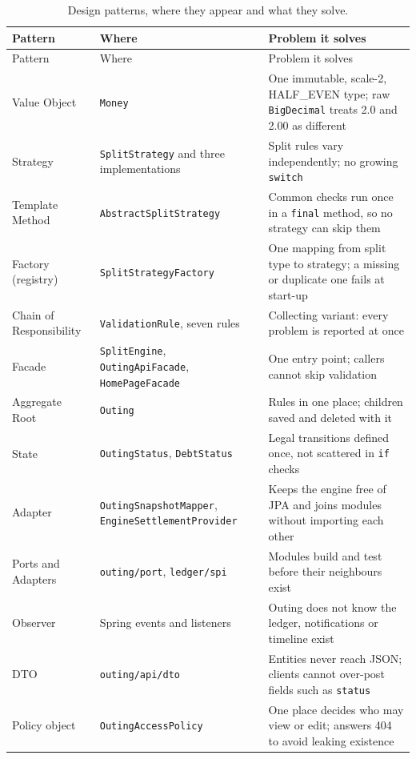 \documentclass[10pt,a4paper]{article}
\newcommand{\code}[1]{\texttt{#1}}
\begin{document}
{\small
\begin{longtable}{@{}>{\raggedright\arraybackslash}p{3.1cm}>{\raggedright\arraybackslash}p{4.2cm}>{\raggedright\arraybackslash}p{8.1cm}@{}}
\caption{Design patterns, where they appear and what they solve.}\label{tab:patterns}\\
\toprule
Pattern & Where & Problem it solves \\
\midrule
\endfirsthead
\toprule
Pattern & Where & Problem it solves \\
\midrule
\endhead
\bottomrule
\endfoot
Value Object & \code{Money} & One immutable, scale-2, HALF\_EVEN type; raw \code{BigDecimal} treats 2.0 and 2.00 as different \\
Strategy & \code{SplitStrategy} and three implementations & Split rules vary independently; no growing \code{switch} \\
Template Method & \code{AbstractSplitStrategy} & Common checks run once in a \code{final} method, so no strategy can skip them \\
Factory (registry) & \code{SplitStrategyFactory} & One mapping from split type to strategy; a missing or duplicate one fails at start-up \\
Chain of Responsibility & \code{ValidationRule}, seven rules & Collecting variant: every problem is reported at once \\
Facade & \code{SplitEngine}, \code{OutingApiFacade}, \code{HomePageFacade} & One entry point; callers cannot skip validation \\
Aggregate Root & \code{Outing} & Rules in one place; children saved and deleted with it \\
State & \code{OutingStatus}, \code{DebtStatus} & Legal transitions defined once, not scattered in \code{if} checks \\
Adapter & \code{OutingSnapshotMapper}, \code{EngineSettlementProvider} & Keeps the engine free of JPA and joins modules without importing each other \\
Ports and Adapters & \code{outing/port}, \code{ledger/spi} & Modules build and test before their neighbours exist \\
Observer & Spring events and listeners & Outing does not know the ledger, notifications or timeline exist \\
DTO & \code{outing/api/dto} & Entities never reach JSON; clients cannot over-post fields such as \code{status} \\
Policy object & \code{OutingAccessPolicy} & One place decides who may view or edit; answers 404 to avoid leaking existence \\
\end{longtable}}
\end{document}
